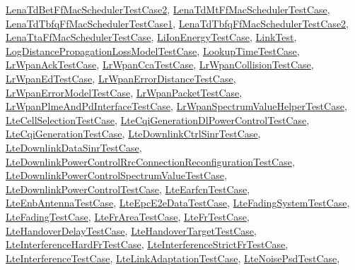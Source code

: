 \hyperlink{classLenaTdBetFfMacSchedulerTestCase2}{Lena\+Td\+Bet\+Ff\+Mac\+Scheduler\+Test\+Case2}, \hyperlink{classLenaTdMtFfMacSchedulerTestCase}{Lena\+Td\+Mt\+Ff\+Mac\+Scheduler\+Test\+Case}, \hyperlink{classLenaTdTbfqFfMacSchedulerTestCase1}{Lena\+Td\+Tbfq\+Ff\+Mac\+Scheduler\+Test\+Case1}, \hyperlink{classLenaTdTbfqFfMacSchedulerTestCase2}{Lena\+Td\+Tbfq\+Ff\+Mac\+Scheduler\+Test\+Case2}, \hyperlink{classLenaTtaFfMacSchedulerTestCase}{Lena\+Tta\+Ff\+Mac\+Scheduler\+Test\+Case}, \hyperlink{classLiIonEnergyTestCase}{Li\+Ion\+Energy\+Test\+Case}, \hyperlink{classLinkTest}{Link\+Test}, \hyperlink{classLogDistancePropagationLossModelTestCase}{Log\+Distance\+Propagation\+Loss\+Model\+Test\+Case}, \hyperlink{classLookupTimeTestCase}{Lookup\+Time\+Test\+Case}, \hyperlink{classLrWpanAckTestCase}{Lr\+Wpan\+Ack\+Test\+Case}, \hyperlink{classLrWpanCcaTestCase}{Lr\+Wpan\+Cca\+Test\+Case}, \hyperlink{classLrWpanCollisionTestCase}{Lr\+Wpan\+Collision\+Test\+Case}, \hyperlink{classLrWpanEdTestCase}{Lr\+Wpan\+Ed\+Test\+Case}, \hyperlink{classLrWpanErrorDistanceTestCase}{Lr\+Wpan\+Error\+Distance\+Test\+Case}, \hyperlink{classLrWpanErrorModelTestCase}{Lr\+Wpan\+Error\+Model\+Test\+Case}, \hyperlink{classLrWpanPacketTestCase}{Lr\+Wpan\+Packet\+Test\+Case}, \hyperlink{classLrWpanPlmeAndPdInterfaceTestCase}{Lr\+Wpan\+Plme\+And\+Pd\+Interface\+Test\+Case}, \hyperlink{classLrWpanSpectrumValueHelperTestCase}{Lr\+Wpan\+Spectrum\+Value\+Helper\+Test\+Case}, \hyperlink{classLteCellSelectionTestCase}{Lte\+Cell\+Selection\+Test\+Case}, \hyperlink{classLteCqiGenerationDlPowerControlTestCase}{Lte\+Cqi\+Generation\+Dl\+Power\+Control\+Test\+Case}, \hyperlink{classLteCqiGenerationTestCase}{Lte\+Cqi\+Generation\+Test\+Case}, \hyperlink{classLteDownlinkCtrlSinrTestCase}{Lte\+Downlink\+Ctrl\+Sinr\+Test\+Case}, \hyperlink{classLteDownlinkDataSinrTestCase}{Lte\+Downlink\+Data\+Sinr\+Test\+Case}, \hyperlink{classLteDownlinkPowerControlRrcConnectionReconfigurationTestCase}{Lte\+Downlink\+Power\+Control\+Rrc\+Connection\+Reconfiguration\+Test\+Case}, \hyperlink{classLteDownlinkPowerControlSpectrumValueTestCase}{Lte\+Downlink\+Power\+Control\+Spectrum\+Value\+Test\+Case}, \hyperlink{classLteDownlinkPowerControlTestCase}{Lte\+Downlink\+Power\+Control\+Test\+Case}, \hyperlink{classLteEarfcnTestCase}{Lte\+Earfcn\+Test\+Case}, \hyperlink{classLteEnbAntennaTestCase}{Lte\+Enb\+Antenna\+Test\+Case}, \hyperlink{classLteEpcE2eDataTestCase}{Lte\+Epc\+E2e\+Data\+Test\+Case}, \hyperlink{classLteFadingSystemTestCase}{Lte\+Fading\+System\+Test\+Case}, \hyperlink{classLteFadingTestCase}{Lte\+Fading\+Test\+Case}, \hyperlink{classLteFrAreaTestCase}{Lte\+Fr\+Area\+Test\+Case}, \hyperlink{classLteFrTestCase}{Lte\+Fr\+Test\+Case}, \hyperlink{classLteHandoverDelayTestCase}{Lte\+Handover\+Delay\+Test\+Case}, \hyperlink{classLteHandoverTargetTestCase}{Lte\+Handover\+Target\+Test\+Case}, \hyperlink{classLteInterferenceHardFrTestCase}{Lte\+Interference\+Hard\+Fr\+Test\+Case}, \hyperlink{classLteInterferenceStrictFrTestCase}{Lte\+Interference\+Strict\+Fr\+Test\+Case}, \hyperlink{classLteInterferenceTestCase}{Lte\+Interference\+Test\+Case}, \hyperlink{classLteLinkAdaptationTestCase}{Lte\+Link\+Adaptation\+Test\+Case}, \hyperlink{classLteNoisePsdTestCase}{Lte\+Noise\+Psd\+Test\+Case}, 